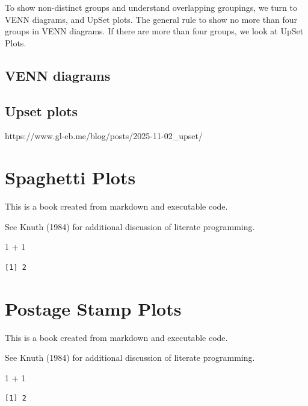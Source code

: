 \documentclass[
  letterpaper,
  DIV=11,
  numbers=noendperiod]{scrreprt}
\newenvironment{Shaded}{\begin{snugshade}}{\end{snugshade}}
\newcommand{\DecValTok}[1]{\textcolor[rgb]{0.68,0.00,0.00}{#1}}
\newcommand{\SpecialCharTok}[1]{\textcolor[rgb]{0.37,0.37,0.37}{#1}}
\begin{document}
To show non-distinct groups and understand overlapping groupings, we
turn to VENN diagrams, and UpSet plots. The general rule to show no more
than four groups in VENN diagrams. If there are more than four groups,
we look at UpSet Plots.

\section{VENN diagrams}\label{venn-diagrams}

\section{Upset plots}\label{upset-plots}

https://www.gl-eb.me/blog/posts/2025-11-02\_upset/

\chapter{Spaghetti Plots}\label{spaghetti-plots}

This is a book created from markdown and executable code.

See Knuth (1984) for additional discussion of literate programming.

\begin{Shaded}
\begin{Highlighting}[]
\DecValTok{1} \SpecialCharTok{+} \DecValTok{1}
\end{Highlighting}
\end{Shaded}

\begin{verbatim}
[1] 2
\end{verbatim}

\chapter{Postage Stamp Plots}\label{postage-stamp-plots}

This is a book created from markdown and executable code.

See Knuth (1984) for additional discussion of literate programming.

\begin{Shaded}
\begin{Highlighting}[]
\DecValTok{1} \SpecialCharTok{+} \DecValTok{1}
\end{Highlighting}
\end{Shaded}

\begin{verbatim}
[1] 2
\end{verbatim}
\end{document}
